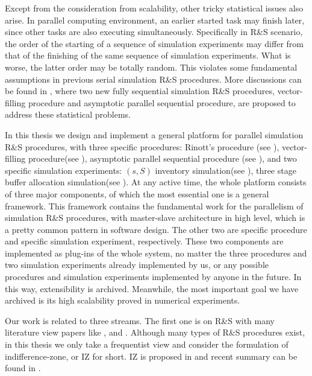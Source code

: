 Except from the consideration from scalability, other tricky statistical issues also arise. In parallel computing environment, an earlier started task may finish later, since other tasks are also executing simultaneously. Specifically in R\&S scenario, the order of the starting of a sequence of simulation experiments may differ from that of the finishing of the same sequence of simulation experiments. What is worse, the latter order may be totally random. This violates some fundamental assumptions in previous serial simulation R\&S procedures. More discussions can be found in \cite{ras-seq-parallel}, where two new fully sequential simulation R\&S procedures, vector-filling procedure and asymptotic parallel sequential procedure, are proposed to address these statistical problems.

In this thesis we design and implement a general platform for parallel simulation R\&S procedures, with three specific procedures: Rinott's procedure (see \cite{cistam1978rinott}), vector-filling procedure(see \cite{ras-seq-parallel}), asymptotic parallel sequential procedure (see \cite{ras-seq-parallel}), and two specific simulation experiments: $(s, S)$ inventory simulation(see \cite{cissac1985ss}), three stage buffer allocation simulation(see \cite{smoms93threestage}). At any active time, the whole platform consists of three major components, of which the most essential one is a general framework. This framework contains the fundamental work for the parallelism of simulation R\&S procedures, with master-slave architecture in high level, which is a pretty common pattern in software design. The other two are specific procedure and specific simulation experiment, respectively. These two components are implemented as plug-ins of the whole system, no matter the three procedures and two simulation experiments already implemented by us, or any possible procedures and simulation experiments implemented by anyone in the future. In this way, extensibility is archived. Meanwhile, the most important goal we have archived is its high scalability proved in numerical experiments.

Our work is related to three streams. The first one is on R\&S with many literature view papers like \cite{ras-recent-advances}, \cite{ehiorams06ras} and \cite{ms05ras}. Although many types of R\&S procedures exist, in this thesis we only take a frequentist view and consider the formulation of indifference-zone, or IZ for short. IZ is proposed in \cite{toams1954iz} and recent summary can be found in \cite{nyjws95iz}.


